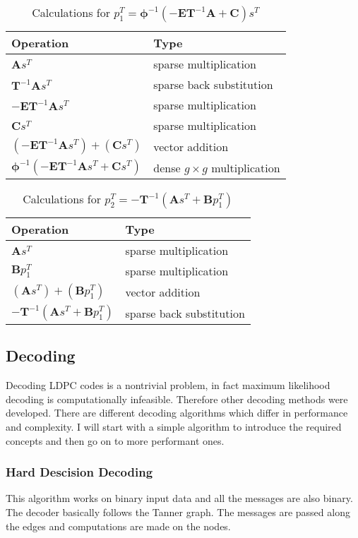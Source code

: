 \begin{table}
	\begin{tabular}{l l}
		Operation & Type \\ \toprule
		$\bm{A}s^T$ & sparse multiplication \\
		$\bm{T}^{-1}\bm{A}s^T$ & sparse back substitution \\
		$-\bm{E}\bm{T}^{-1}\bm{A}s^T$ & sparse multiplication \\
		$\bm{C}s^T$ & sparse multiplication \\
		$\left(-\bm{E}\bm{T}^{-1}\bm{A}s^T\right) + \left(\bm{C}s^T\right)$ & vector addition \\
		$\bm{\phi}^{-1}\left(-\bm{E}\bm{T}^{-1}\bm{A}s^T + \bm{C}s^T\right)$ & dense $g\times g$ multiplication\\
	\end{tabular}
	\centering
	\caption{Calculations for $p_1^T = \bm{\phi}^{-1}\left(-\bm{E}\bm{T}^{-1}\bm{A} + \bm{C}\right)s^T$}
	\label{p1_steps}
\end{table}
\begin{table}
	\begin{tabular}{l l}
		Operation & Type \\ \toprule
		$\bm{A}s^T$ & sparse multiplication \\
		$\bm{B}p_1^T$ & sparse multiplication \\
		$\left(\bm{A}s^T\right) + \left(\bm{B}p_1^T\right)$ & vector addition \\
		$-\bm{T}^{-1}\left(\bm{A}s^T + \bm{B}p_1^T\right)$ & sparse back substitution \\
	\end{tabular}
	\centering
	\caption{Calculations for $p_2^T = -\bm{T}^{-1}\left(\bm{A}s^T + \bm{B}p_1^T\right)$}
	\label{p2_steps}
\end{table}

\subsection{Decoding}
Decoding LDPC codes is a nontrivial problem, in fact maximum likelihood decoding is computationally infeasible. Therefore other decoding methods were developed. There are different decoding algorithms which differ in performance and complexity. I will start with a simple algorithm to introduce the required concepts and then go on to more performant ones.

\subsubsection{Hard Descision Decoding}
This algorithm works on binary input data and all the messages are also binary. The decoder basically follows the Tanner graph. The messages are passed along the edges and computations are made on the nodes.

